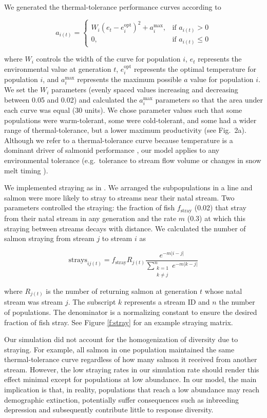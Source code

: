 We generated the thermal-tolerance performance curves according to

\[a_{i(t)} = \begin{cases} W_i (e_t - e_i^{\mathrm{opt}})^2 +
a_i^{\mathrm{max}}, & \text{if } a_{i(t)} > 0\\ 0, & \text{if } a_{i(t)} \leq
0 \end{cases}\]

where $W_i$ controls the width of the curve for population $i$, $e_t$ represents the environmental value at generation $t$, $e_i^{\mathrm{opt}}$ represents the optimal temperature for population $i$, and $a_i^{\mathrm{max}}$ represents the maximum possible $a$ value for population $i$. We set the $W_i$ parameters (evenly spaced values increasing and decreasing between 0.05 and 0.02) and calculated the $a_i^{\mathrm{max}}$ parameters so that the area under each curve was equal (30 units). We chose parameter values such that some populations were warm-tolerant, some were cold-tolerant, and some had a wider range of thermal-tolerance, but a lower maximum productivity (see Fig.~2a). Although we refer to a thermal-tolerance curve because temperature is a dominant driver of salmonid performance \citep{mccullough1999}, our model applies to any environmental tolerance (e.g.~tolerance to stream flow volume or changes in snow melt timing \citep{crozier2008}).

We implemented straying as in \citet{cooper1999}. We arranged the subpopulations in a line and salmon were more likely to stray to streams near their natal stream. Two parameters controlled the straying: the fraction of fish $f_{\mathrm{stray}}$ (0.02) that stray from their natal stream in any generation and the rate $m$ (0.3) at which this straying between streams decays with distance. We calculated the number of salmon straying from stream $j$ to stream $i$ as

\[\mathrm{strays}_{ij(t)} = f_{\mathrm{stray}} R_{j(t)} \frac{e^{-m \lvert i-j
\rvert }} {\displaystyle\sum\limits_{ \substack{k = 1 \\ k \neq j}}^{n} e^{-m
\lvert k-j \rvert }}\]

where $R_{j(t)}$ is the number of returning salmon at generation $t$ whose natal stream was stream $j$. The subscript $k$ represents a stream ID and $n$ the number of populations. The denominator is a normalizing constant to ensure the desired fraction of fish stray. See Figure \ref{f:stray} for an example straying matrix.

Our simulation did not account for the homogenization of diversity due to straying. For example, all salmon in one population maintained the same thermal-tolerance curve regardless of how many salmon it received from another stream. However, the low straying rates in our simulation rate should render this effect minimal except for populations at low abundance. In our model, the main implication is that, in reality, populations that reach a low abundance may reach demographic extinction, potentially suffer consequences such as inbreeding depression \citep{wang2002} and subsequently contribute little to response diversity.

